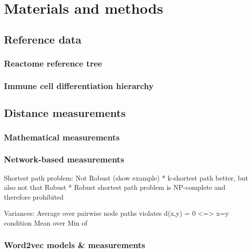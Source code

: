 \documentclass{thesisclass}
\begin{document}
\chapter{Materials and methods} \label{ch:methods}

\section{Reference data}

\subsection{Reactome reference tree}

\subsection{Immune cell differentiation hierarchy}

\section{Distance measurements}

\subsection{Mathematical measurements}

\subsection{Network-based measurements}


Shortest path problem:
Not Robust (show example)
* k-shortest path better, but also not that Robust
* Robust shortest path problem is NP-complete and therefore prohibited


Variances:
Average over pairwise node paths violates d(x,y) = 0 <=> x=y condition
Mean over Min of 

\subsection{Word2vec models \& measurements}
\end{document}
